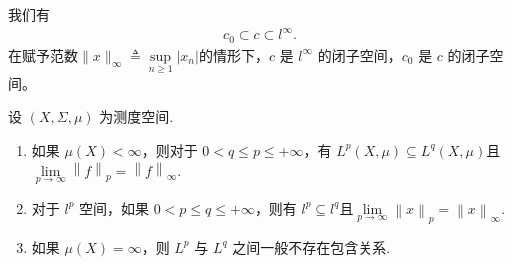 \documentclass[../../main.tex]{subfiles}%
\begin{document}
\begin{proposition}
我们有
\begin{align*}
c_0 \subset c \subset l^{\infty}.
\end{align*}
在赋予范数\(\|x\|_{\infty} \triangleq \sup\limits_{n \geqslant 1} |x_n|\)的情形下，\(c\) 是 \(l^{\infty}\) 的闭子空间，\(c_0\) 是 \(c\) 的闭子空间。
\end{proposition}

\begin{proposition}\label{proposition:Lp空间包含关系}
设 \((X, \Sigma, \mu)\) 为测度空间.
\begin{enumerate}[(1)]
\item\label{proposition:Lp空间包含关系-1} 如果 \(\mu(X) < \infty\)，则对于 \(0 < q \leqslant p \leqslant +\infty\)，有 \(L^p(X, \mu) \subseteq L^q(X, \mu)\)且$\underset{p\rightarrow \infty}{\lim}\left\| f \right\| _p=\left\| f \right\| _{\infty}.$

\item 对于 \(l^p\) 空间，如果 \(0 < p \leqslant q \leqslant +\infty\)，则有 \(l^p \subseteq l^q\)且$\underset{p\rightarrow \infty}{\lim}\left\| x \right\| _p=\left\| x \right\| _{\infty}.$

\item 如果 \(\mu(X) = \infty\)，则 \(L^p\) 与 \(L^q\) 之间一般不存在包含关系.
\end{enumerate}
\end{proposition}
\end{document}
